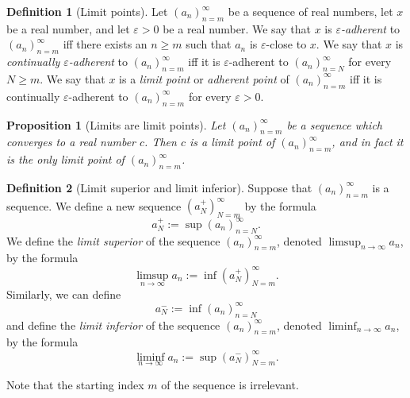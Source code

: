 \documentclass[
]{book}
\newtheorem{proposition}{Proposition}[chapter]
\theoremstyle{definition}
\newtheorem{definition}{Definition}[chapter]
\theoremstyle{definition}
\theoremstyle{definition}
\theoremstyle{definition}
\theoremstyle{remark}
\begin{document}
\begin{definition}[Limit points]
Let \((a_n)_{n=m}^{\infty}\) be a sequence of real numbers, let \(x\) be a real number, and let \(\varepsilon>0\) be a real number. We say that \(x\) is \emph{\(\varepsilon\)-adherent} to \((a_n)_{n=m}^{\infty}\) iff there exists an \(n\geq m\) such that \(a_n\) is \(\varepsilon\)-close to \(x\). We say that \(x\) is \emph{continually \(\varepsilon\)-adherent} to \((a_n)_{n=m}^{\infty}\) iff it is \(\varepsilon\)-adherent to \((a_n)_{n=N}^{\infty}\) for every \(N\geq m\). We say that \(x\) is a \emph{limit point} or \emph{adherent point} of \((a_n)_{n=m}^{\infty}\) iff it is continually \(\varepsilon\)-adherent to \((a_n)_{n=m}^{\infty}\) for every \(\varepsilon>0\).
\end{definition}

\begin{proposition}[Limits are limit points]
Let \((a_n)_{n=m}^{\infty}\) be a sequence which converges to a real number \(c\). Then \(c\) is a limit point of \((a_n)_{n=m}^{\infty}\), and in fact it is the only limit point of \((a_n)_{n=m}^{\infty}\).
\end{proposition}

\begin{definition}[Limit superior and limit inferior]
Suppose that \((a_n)_{n=m}^{\infty}\) is a sequence. We define a new sequence \((a_N^+)_{N=m}^{\infty}\) by the formula
\[
a_N^+:=\sup(a_n)_{n=N}^{\infty}.
\]
We define the \emph{limit superior} of the sequence \((a_n)_{n=m}^{\infty}\), denoted \(\limsup_{n\to\infty}a_n\), by the formula
\[
\limsup_{n\to\infty}a_n := \inf (a_N^+)_{N=m}^{\infty}.
\]
Similarly, we can define
\[
a_N^-:=\inf(a_n)_{n=N}^{\infty}
\]
and define the \emph{limit inferior} of the sequence \((a_n)_{n=m}^{\infty}\), denoted \(\liminf_{n\to\infty}a_n\), by the formula
\[
\liminf_{n\to\infty}a_n := \sup (a_N^-)_{N=m}^{\infty}.
\]
\end{definition}

Note that the starting index \(m\) of the sequence is irrelevant.
\end{document}
